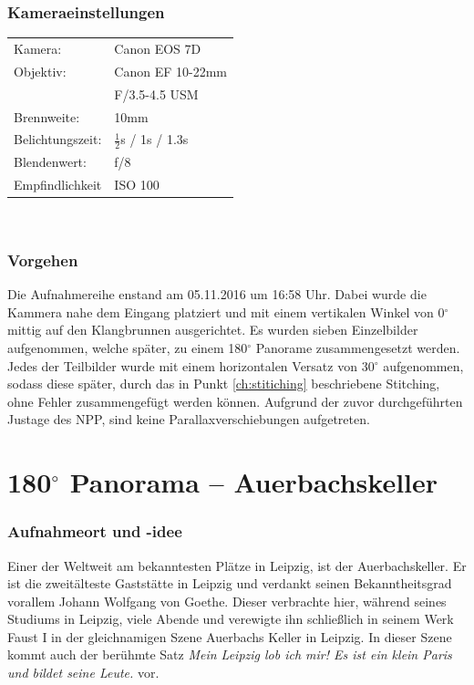 \documentclass[liststotoc,bibtotoc,fontsize=14pt,]{scrreprt}
\begin{document}
		\subsubsection{Kameraeinstellungen}
		\begin{minipage}{0.58\textwidth}
			\begin{tabular}{ll}
				Kamera: &Canon EOS 7D \\
				Objektiv: &Canon EF 10-22mm \\
				& F/3.5-4.5 USM\\		
				Brennweite:& 10mm \\
				Belichtungszeit: & $\frac{1}{2}$s / 1s / 1.3s\\
				Blendenwert: & f/8\\
				Empfindlichkeit & ISO 100 \\
			\end{tabular}\\
		\end{minipage}%
		\begin{minipage}{0.42\textwidth}

		\end{minipage}%
		
	\subsubsection{Vorgehen}
	 Die Aufnahmereihe enstand am 05.11.2016 um 16:58 Uhr. Dabei wurde die Kammera nahe dem Eingang platziert und mit einem vertikalen Winkel von 0$^\circ$ mittig auf den Klangbrunnen ausgerichtet. Es wurden sieben Einzelbilder aufgenommen, welche später, zu einem 180$^\circ$ Panorame zusammengesetzt werden. Jedes der Teilbilder wurde mit einem horizontalen Versatz von 30$^\circ$ aufgenommen, sodass diese später, durch das in Punkt \ref{ch:stitiching} beschriebene Stitching, ohne Fehler zusammengefügt werden können. Aufgrund der zuvor durchgeführten Justage des NPP, sind keine Parallaxverschiebungen aufgetreten.
	
	\section{180$^\circ$ Panorama -- Auerbachskeller}
	\label{sec:auer}
	\subsubsection{Aufnahmeort und -idee}
	Einer der Weltweit am bekanntesten Plätze in Leipzig, ist der Auerbachskeller. Er ist die zweitälteste Gaststätte in Leipzig und verdankt seinen Bekanntheitsgrad vorallem Johann Wolfgang von Goethe. Dieser verbrachte hier, während seines Studiums in Leipzig, viele Abende und verewigte ihn schließlich in seinem Werk Faust I in der gleichnamigen Szene \grqq{}Auerbachs Keller in Leipzig\grqq{}. In dieser Szene kommt auch der berühmte Satz \textit{\grqq{}Mein Leipzig lob ich mir! Es ist ein klein Paris und bildet seine Leute.\grqq{}} vor.
	
\end{document}
